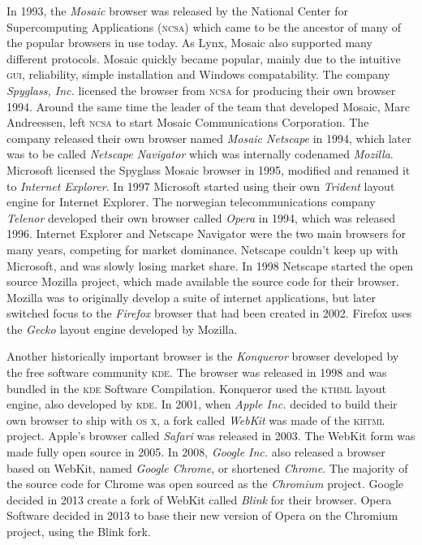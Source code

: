 \documentclass[a4paper,11pt]{kth-mag}
\begin{document}
        In 1993, the \emph{Mosaic} browser was released by the National Center for Supercomputing Applications (\textsc{ncsa}) which came to be the ancestor of many of the popular browsers in use today.
        As Lynx, Mosaic also supported many different protocols.
        Mosaic quickly became popular, mainly due to the intuitive \textsc{gui}, reliability, simple installation and Windows compatability.
        The company \emph{Spyglass, Inc.} licensed the browser from \textsc{ncsa} for producing their own browser 1994.
        Around the same time the leader of the team that developed Mosaic, Marc Andreessen, left \textsc{ncsa} to start Mosaic Communications Corporation.
        The company released their own browser named \emph{Mosaic Netscape} in 1994, which later was to be called \emph{Netscape Navigator} which was internally codenamed \emph{Mozilla}.
        Microsoft licensed the Spyglass Mosaic browser in 1995, modified and renamed it to \emph{Internet Explorer}.
        In 1997 Microsoft started using their own \emph{Trident} layout engine for Internet Explorer.
        The norwegian telecommunications company \emph{Telenor} developed their own browser called \emph{Opera} in 1994, which was released 1996.
        Internet Explorer and Netscape Navigator were the two main browsers for many years, competing for market dominance.
        Netscape couldn't keep up with Microsoft, and was slowly losing market share.
        In 1998 Netscape started the open source Mozilla project, which made available the source code for their browser.
        Mozilla was to originally develop a suite of internet applications, but later switched focus to the \emph{Firefox} browser that had been created in 2002.
        Firefox uses the \emph{Gecko} layout engine developed by Mozilla.

        Another historically important browser is the \emph{Konqueror} browser developed by the free software community \textsc{kde}.
        The browser was released in 1998 and was bundled in the \textsc{kde} Software Compilation.
        Konqueror used the \textsc{kthml} layout engine, also developed by \textsc{kde}.
        In 2001, when \emph{Apple Inc.} decided to build their own browser to ship with \textsc{os x}, a fork called \emph{WebKit} was made of the \textsc{khtml} project.
        Apple's browser called \emph{Safari} was released in 2003.
        The WebKit form was made fully open source in 2005.
        In 2008, \emph{Google Inc.} also released a browser based on WebKit, named \emph{Google Chrome}, or shortened \emph{Chrome}.
        The majority of the source code for Chrome was open sourced as the \emph{Chromium} project.
        Google decided in 2013 create a fork of WebKit called \emph{Blink} for their browser.
        Opera Software decided in 2013 to base their new version of Opera on the Chromium project, using the Blink fork.
\end{document}
